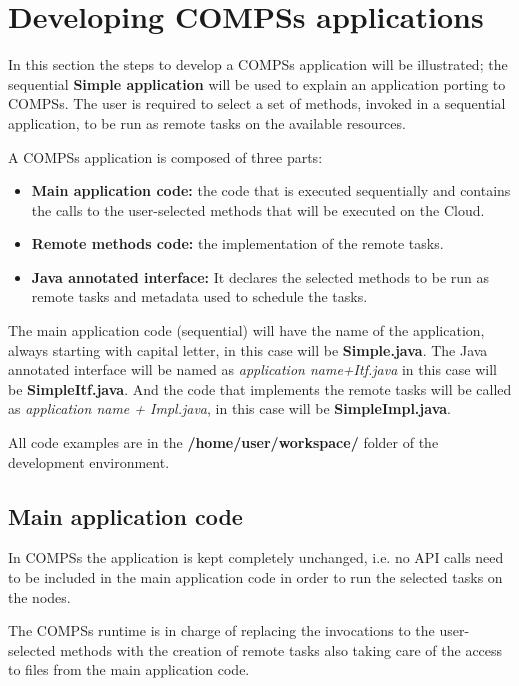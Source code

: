 \section{Developing COMPSs applications}
\label{sec:Developing}

In this section the steps to develop a COMPSs application will be illustrated; the sequential {\bf Simple application}
will be used to explain an application porting to COMPSs. The user is required to select a set of
methods, invoked in a sequential application, to be run as remote tasks on the available resources.

A COMPSs application is composed of three parts:
\begin{itemize}
 \item {\bf Main application code:} the code that is executed sequentially and contains the calls to the user-selected methods that will be executed on the Cloud.
 \item {\bf Remote methods code:} the implementation of the remote tasks.
 \item {\bf Java annotated interface:} It declares the selected methods to be run as remote tasks and metadata used to schedule the tasks.
\end{itemize}

The main application code (sequential) will have the name of the application, always starting with capital
letter, in this case will be {\bf Simple.java}. The Java annotated interface will be named as {\it application name+Itf.java} 
in this case will be {\bf SimpleItf.java}. And the code that implements the remote tasks will be called as
{\it application name + Impl.java}, in this case will be {\bf SimpleImpl.java}.

All code examples are in the {\bf /home/user/workspace/} folder of the development environment.

\subsection{Main application code}

In COMPSs the application is kept completely unchanged, i.e. no API calls need to be included in the main
application code in order to run the selected tasks on the nodes.

The COMPSs runtime is in charge of replacing the invocations to the user-selected methods with the
creation of remote tasks also taking care of the access to files from the main application code.

